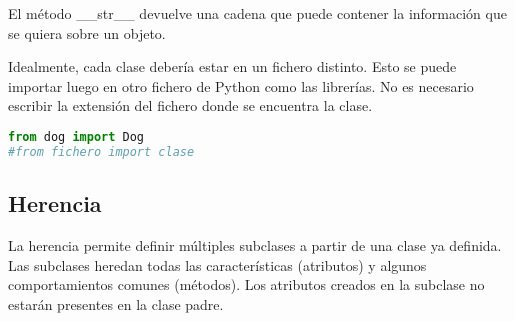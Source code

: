 El método \_\_str\_\_ devuelve una cadena que puede contener la información que se quiera sobre un objeto.

Idealmente, cada clase debería estar en un fichero distinto. Esto se puede importar luego en otro fichero de Python como las librerías. No es necesario escribir la extensión del fichero donde se encuentra la clase.
\begin{lstlisting}[language=Python]
from dog import Dog
#from fichero import clase
\end{lstlisting}

\subsection{Herencia}
La herencia permite definir múltiples subclases a partir de una clase ya definida. Las subclases heredan todas las características (atributos) y algunos comportamientos comunes (métodos). Los atributos creados en la subclase no estarán presentes en la clase padre.

